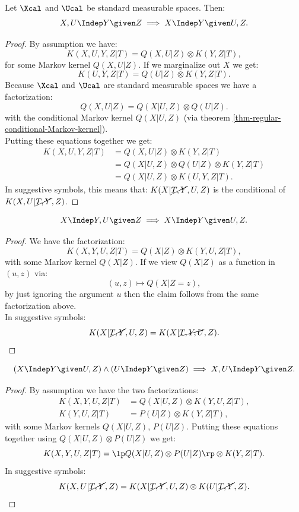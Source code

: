 \begin{Lem} Let $\Xcal$ and $\Ucal$ be standard measurable spaces. Then:
    \[X , U \Indep  Y  \given Z \implies X \Indep  Y \given U,Z.\]
\begin{proof}
    By assumption we have:
    \[K(X,U,Y,Z|T) = Q(X,U|Z) \otimes K(Y,Z|T),\]
    for some Markov kernel $Q(X,U|Z)$. 
    If we marginalize out $X$ we get:
    \[K(U,Y,Z|T) = Q(U|Z) \otimes K(Y,Z|T).\]
    Because $\Xcal$ and $\Ucal$ are standard measurable spaces
    we have a factorization:
    \[ Q(X,U|Z) = Q(X|U,Z) \otimes Q(U|Z).\]
    with the conditional Markov kernel $Q(X|U,Z)$ (via theorem \ref{thm-regular-conditional-Markov-kernel}).\\
    Putting these equations together we get:
    \begin{align*}
        K(X,U,Y,Z|T) &= Q(X,U|Z) \otimes K(Y,Z|T)\\
                     &= Q(X|U,Z) \otimes Q(U|Z) \otimes K(Y,Z|T) \\
                     &= Q(X|U,Z) \otimes  K(U,Y,Z|T).
    \end{align*}
  In suggestive symbols, this means that:
  $K(X|\cancel{T,Y},U,Z)$ is the conditional of $K(X,U|\cancel{T,Y},Z)$.
\end{proof}
\end{Lem}

\begin{Lem} 
    \[X \Indep  Y , U \given Z \implies X \Indep  Y \given U , Z.\]
\begin{proof}
    We have the factorization:
    \[K(X,Y,U,Z|T) = Q(X|Z) \otimes K(Y,U,Z|T),\]
    with some Markov kernel $Q(X|Z)$. If we view $Q(X|Z)$ as a function in $(u,z)$ via:
    \[ (u,z) \mapsto Q(X|Z=z), \]
    by just ignoring the argument $u$ then the claim follows from the same factorization above.\\
    In suggestive symbols:
    \[K(X|\cancel{T,Y},U,Z) = K(X|\cancel{T,Y,U},Z).\]
\end{proof}
\end{Lem}

\begin{Lem} 
    \[ (X \Indep  Y \given U , Z) \land (U \Indep  Y \given Z) \implies X , U \Indep  Y \given Z.\]
\begin{proof}
    By assumption we have the two factorizations:
    \begin{align*}
        K(X,Y,U,Z|T) & = Q(X|U,Z) \otimes K(Y,U,Z|T),\\
        K(Y,U,Z|T) & = P(U|Z) \otimes K(Y,Z|T),
    \end{align*}
    with some Markov kernels $Q(X|U,Z)$, $P(U|Z)$. Putting these equations together using $Q(X|U,Z) \otimes P(U|Z)$ we get:
    \[ K(X,Y,U,Z|T) = \lp Q(X|U,Z) \otimes P(U|Z)\rp \otimes K(Y,Z|T).\]
    In suggestive symbols:
    \[K(X,U|\cancel{T,Y},Z) = K(X|\cancel{T,Y},U,Z) \otimes K(U|\cancel{T,Y},Z).\]
\end{proof}
\end{Lem}

